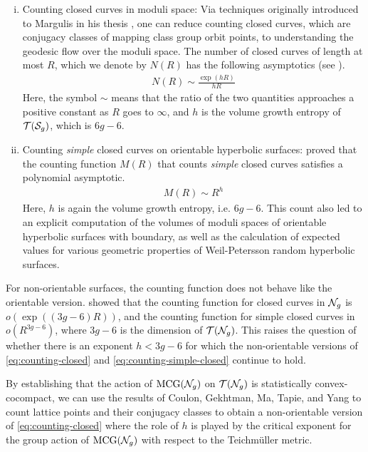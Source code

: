 \begin{enumerate}[(i)]
\item Counting closed curves in moduli space: Via techniques originally introduced to Margulis in his thesis \cite{margulis2004some}, one can reduce counting closed curves, which are conjugacy classes of mapping class group orbit points, to understanding the geodesic flow over the moduli space.
  The number of closed curves of length at most $R$, which we denote by $N(R)$ has the following asymptotics (see \cite{eskinmirzakhani}).
  \begin{align}
    \label{eq:counting-closed}
    N(R) \sim \frac{\exp(hR)}{hR}
  \end{align}
  Here, the symbol $\sim$ means that the ratio of the two quantities approaches a positive constant as $R$ goes to $\infty$, and $h$ is the volume growth entropy of $\mathcal{T}(\mathcal{S}_{g})$, which is $6g-6$.
\item Counting \emph{simple} closed curves on orientable hyperbolic surfaces: \textcite{mirzakhani2008growth} proved that the counting function $M(R)$ that counts \emph{simple} closed curves satisfies a polynomial asymptotic.
  \begin{align}
    \label{eq:counting-simple-closed}
    M(R) \sim R^{h}
  \end{align}
  Here, $h$ is again the volume growth entropy, i.e. $6g-6$.
  This count also led to an explicit computation of the volumes of moduli spaces of orientable hyperbolic surfaces with boundary, as well as the calculation of expected values for various geometric properties of Weil-Petersson random hyperbolic surfaces.
\end{enumerate}

For non-orientable surfaces, the counting function does not behave like the orientable version.
\textcite{gendulphe2017whats} showed that the counting function for closed curves in $\mathcal{N}_g$ is $o(\exp((3g-6)R))$, and the counting function for simple closed curves in $o(R^{3g-6})$, where $3g-6$ is the dimension of $\mathcal{T}(\mathcal{N}_g)$.
This raises the question of whether there is an exponent $h < 3g-6$ for which the non-orientable versions of \eqref{eq:counting-closed} and \eqref{eq:counting-simple-closed} continue to hold.

By establishing that the action of $\mathrm{MCG}(\mathcal{N}_g)$ on $\mathcal{T}(\mathcal{N}_g)$ is statistically convex-cocompact, we can use the results of Coulon, Gekhtman, Ma, Tapie, and Yang to count lattice points and their conjugacy classes to obtain a non-orientable version of \eqref{eq:counting-closed} where the role of $h$ is played by the critical exponent for the group action of $\mathrm{MCG}(\mathcal{N}_g)$ with respect to the Teichmüller metric.

